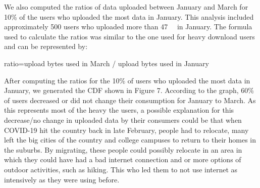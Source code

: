 \documentclass[conference,10pt]{IEEEtran}
\begin{document}
We also computed the ratios of data uploaded between January and March for 10\% of the users who uploaded the most data in January. This analysis included approximately 500 users who uploaded more than \SI{47}{\giga\byte} in January. The formula used to calculate the ratios was similar to the one used for heavy download users and can be represented by:

ratio=upload bytes used in March / upload bytes used in January

After computing the ratios for the 10\% of users who uploaded the most data in January, we generated the CDF shown in Figure 7. According to the graph, 60\% of users decreased or did not change their consumption for January to March. As this represents most of the heavy the users, a possible explanation for this decrease/no change in uploaded data by their consumers could be that when COVID-19 hit the country back in late February, people had to relocate, many left the big cities of the country and college campuses to return to their homes in the suburbs. By migrating, these people could possibly relocate in an area in which they could have had a bad internet connection and or more options of outdoor activities, such as hiking. This who led them to not use internet as intensively as they were using before.
\end{document}
